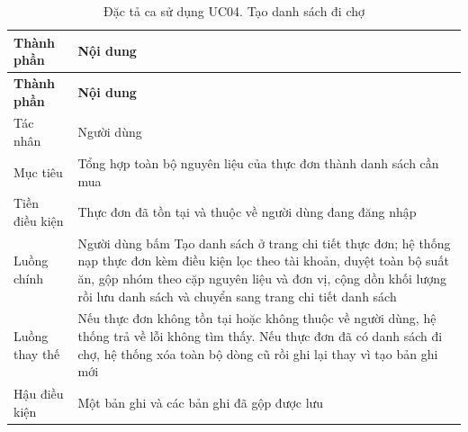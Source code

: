 \begin{longtable}{|P{3.4cm}|P{10.6cm}|}
\caption{Đặc tả ca sử dụng UC04. Tạo danh sách đi chợ}
\label{tab:uc04}\\
\hline
\bfseries Thành phần & \bfseries Nội dung \\ \hline
\endfirsthead
\hline
\bfseries Thành phần & \bfseries Nội dung \\ \hline
\endhead
\endfoot
Tác nhân & Người dùng \\ \hline
Mục tiêu & Tổng hợp toàn bộ nguyên liệu của thực đơn thành danh sách cần mua \\ \hline
Tiền điều kiện & Thực đơn đã tồn tại và thuộc về người dùng đang đăng nhập \\ \hline
Luồng chính & Người dùng bấm Tạo danh sách ở trang chi tiết thực đơn; hệ thống
  nạp thực đơn kèm điều kiện lọc theo tài khoản, duyệt toàn bộ suất ăn, gộp
  nhóm theo cặp nguyên liệu và đơn vị, cộng dồn khối lượng rồi lưu danh sách và
  chuyển sang trang chi tiết danh sách \\ \hline
Luồng thay thế & Nếu thực đơn không tồn tại hoặc không thuộc về người dùng, hệ
  thống trả về lỗi không tìm thấy. Nếu thực đơn đã có danh sách đi chợ, hệ thống
  xóa toàn bộ dòng cũ rồi ghi lại thay vì tạo bản ghi mới \\ \hline
Hậu điều kiện & Một bản ghi  và các bản ghi
   đã gộp được lưu \\ \hline
\end{longtable}


